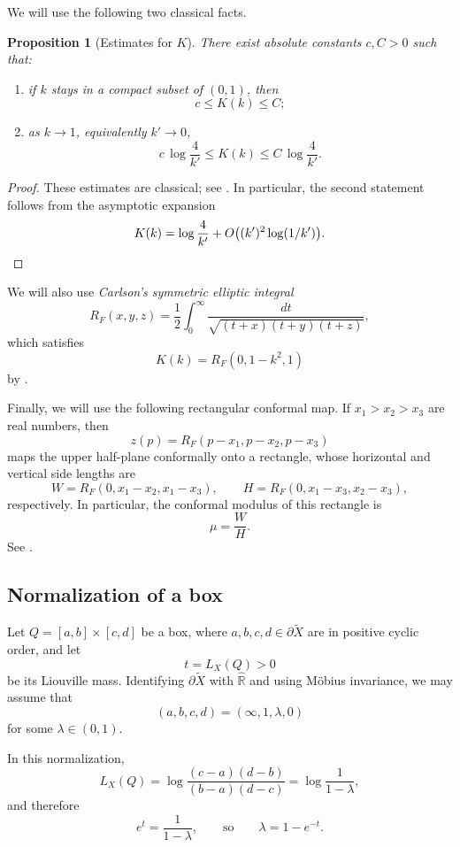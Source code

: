 \documentclass[12pt]{amsart}
\numberwithin{equation}{section}
\numberwithin{figure}{section}
\newtheorem{proposition}[equation]{Proposition}
\theoremstyle{definition}
\theoremstyle{plain}
\newcommand*{\wt}[1]{\widetilde{#1}}
\begin{document}
We will use the following two classical facts.

\begin{proposition}[Estimates for $K$]
\label{prop:K-estimates}
There exist absolute constants $c,C>0$ such that:
\begin{enumerate}
\item if $k$ stays in a compact subset of $(0,1)$, then
\[
c\le K(k)\le C;
\]
\item as $k\to 1$, equivalently $k'\to 0$,
\[
c\,\log\frac{4}{k'}\le K(k)\le C\,\log\frac{4}{k'}.
\]
\end{enumerate}
\end{proposition}

\begin{proof}
These estimates are classical; see \cite[§19.12]{DLMF19:Elliptic}. In particular, the second statement follows from the asymptotic expansion
\[
K(k)=\log\frac{4}{k'}+O\bigl((k')^2\log(1/k')\bigr).
\qedhere
\]
\end{proof}

We will also use \emph{Carlson's symmetric elliptic integral}
\[
R_F(x,y,z)=\frac12\int_0^\infty \frac{dt}{\sqrt{(t+x)(t+y)(t+z)}},
\]
which satisfies
\begin{equation}
K(k)=R_F(0,1-k^2,1)
\label{eq:Carlson}
\end{equation}
by \cite[§19.25]{DLMF19:Elliptic}.

Finally, we will use the following rectangular conformal map. If $x_1>x_2>x_3$ are real numbers, then
\[
z(p)=R_F(p-x_1,p-x_2,p-x_3)
\]
maps the upper half-plane conformally onto a rectangle, whose horizontal and vertical side lengths are
\[
W=R_F(0,x_1-x_2,x_1-x_3),
\qquad
H=R_F(0,x_1-x_3,x_2-x_3),
\]
respectively. In particular, the conformal modulus of this rectangle is
\[
\mu=\frac{W}{H}.
\]
See \cite[§19.32]{DLMF19:Elliptic}.

\subsection{Normalization of a box}

Let $Q=[a,b]\times[c,d]$ be a box, where $a,b,c,d\in \partial\widetilde X$ are in positive cyclic order, and let
\[
t=L_{X}(Q)>0
\]
be its Liouville mass. Identifying $\partial \wt{X}$ with $\widehat{\mathbb R}$ and using M\"obius invariance, we may assume that
\[
(a,b,c,d)=(\infty,1,\lambda,0)
\]
for some $\lambda\in(0,1)$.

In this normalization,
\[
L_{X}(Q)=\log \frac{(c-a)(d-b)}{(b-a)(d-c)}=\log\frac{1}{1-\lambda},
\]
and therefore
\[
e^t=\frac{1}{1-\lambda},
\qquad\text{so}\qquad
\lambda=1-e^{-t}.
\]
\end{document}

